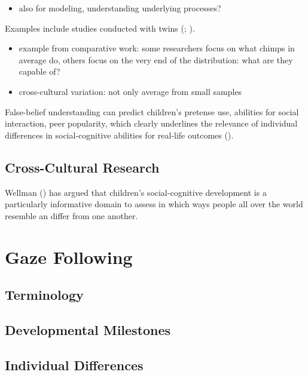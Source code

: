 \documentclass[
]{scrbook}
\providecommand{\tightlist}{%
  \setlength{\itemsep}{0pt}\setlength{\parskip}{0pt}}
\begin{document}
\begin{itemize}
\tightlist
\item
  also for modeling, understanding underlying processes?
\end{itemize}

Examples include studies conducted with twins (; ).

\begin{itemize}
\tightlist
\item
  example from comparative work: some researchers focus on what chimps in average do, others focus on the very end of the distribution: what are they capable of?
\item
  cross-cultural variation: not only average from small samples
\end{itemize}

False-belief understanding can predict children's pretense use, abilities for social interaction, peer popularity, which clearly underlines the relevance of individual differences in social-cognitive abilities for real-life outcomes ().

\subsection{Cross-Cultural Research}\label{cross-cultural-research}

Wellman () has argued that children's social-cognitive development is a particularly informative domain to assess in which ways people all over the world resemble an differ from one another.

\section{Gaze Following}\label{gaze-following}

\subsection{Terminology}\label{terminology-1}

\subsection{Developmental Milestones}\label{developmental-milestones-1}

\subsection{Individual Differences}\label{individual-differences-1}
\end{document}
